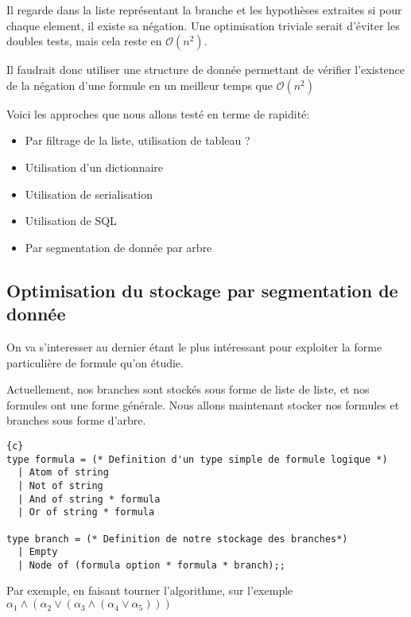 \documentclass{paper}
\begin{document}
Il regarde dans la liste représentant la branche et les hypothèses extraites si pour chaque element, il existe sa négation. Une optimisation triviale serait d'éviter les doubles tests,
mais cela reste en $\mathcal{O}(n^2)$.

Il faudrait donc utiliser une structure de donnée permettant de vérifier l'existence de la négation d'une formule en un meilleur temps que $\mathcal{O}(n^2)$

Voici les approches que nous allons testé en terme de rapidité:

\begin{itemize}
    \item Par filtrage de la liste, utilisation de tableau ?
    \item Utilisation d'un dictionnaire
    \item Utilisation de serialisation
    \item Utilisation de SQL
    \item Par segmentation de donnée par arbre
\end{itemize}

\subsection{Optimisation du stockage par segmentation de donnée}

On va s'interesser au dernier étant le plus intéressant pour exploiter la forme particulière de formule qu'on étudie.

Actuellement, nos branches sont stockés sous forme de liste de liste, et nos formules ont une forme générale. Nous allons maintenant stocker nos formules et branches sous forme d'arbre.

\begin{lstlisting}{c}
type formula = (* Definition d'un type simple de formule logique *)
  | Atom of string
  | Not of string
  | And of string * formula
  | Or of string * formula

type branch = (* Definition de notre stockage des branches*)
  | Empty
  | Node of (formula option * formula * branch);;

\end{lstlisting}

Par exemple, en faisant tourner l'algorithme, sur l'exemple $\alpha_1\land(\alpha_2\lor(\alpha_3\land(\alpha_4\lor\alpha_5)))$ 

\end{document}
